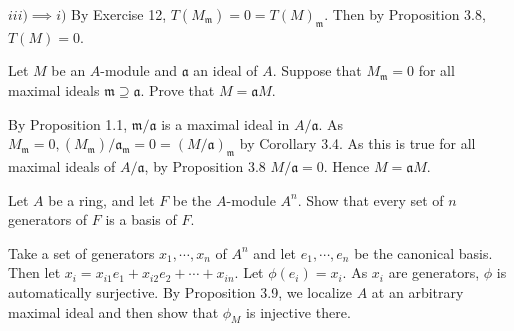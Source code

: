 \documentclass[a4paper]{exam}
\newif\ifhint
\begin{document}
\begin{questions}
\begin{solution}
	$iii) \implies i) $ By Exercise 12, $T(M_{\mathfrak{m}}) = 0 = T(M)_{\mathfrak{m}} $.
	Then by Proposition 3.8, $T(M) = 0 $.
\end{solution}

\question Let $M $ be an $A $-module and $\mathfrak{a} $ an ideal of $A $. Suppose that $M_{\mathfrak{m}} = 0 $ for all maximal ideals $\mathfrak{m} \supseteq \mathfrak{a} $. Prove that $M = \mathfrak{a}M $.
\ifhint
	Pass to the $A / \mathfrak{a} $-module $M / \mathfrak{a}M $ and use (3.8).
\fi
\begin{solution}
	By Proposition 1.1, $\mathfrak{m} / \mathfrak{a} $ is a maximal ideal in $A / \mathfrak{a} $.
	As $M_{\mathfrak{m}} = 0, (M_{\mathfrak{m}}) / \mathfrak{a}_{\mathfrak{m}} = 0 = (M / \mathfrak{a})_{\mathfrak{m}} $ by Corollary 3.4.
	As this is true for all maximal ideals of $A / \mathfrak{a} $, by Proposition 3.8 $M / \mathfrak{a} = 0 $.
	Hence $M = \mathfrak{a}M $.
\end{solution}

\question Let $A$ be a ring, and let $F$ be the $A$-module $A^n$. Show that every set of $n$ generators of $F$ is a basis of $F$.
\ifhint 
	Let $x_{1}, \cdots, x_n$ be a set of generators and $e_{1}, \cdots, e_n$ the canonical basis of $F$. Define $\phi: F \to F$ by $\phi(e_i) = x_i$. Then $\phi$ is surjective and we have to prove that it is an isomorphism. By (3.9) we may assume that $A$ is a local ring. Let $N$ be the kernel of $\phi$ and let $k = A /\mathfrak{m}$ be the residue field of $A$. Since $F$ is a flat $A$-module, the exact sequence $0 \to N \to F \to F \to 0 $ gives an exact sequence $0 \to k \otimes N \to k \otimes F \to k \otimes F \xrightarrow{1 \otimes \phi } 0$. Now $k \otimes F= k^n$ is an $n$-dimensional vector space over $k$; $1 \otimes \phi$ is surjective, hence bijective, hence $k \otimes N = 0$. \\
Also $N$ is finitely generated, by Chapter 2, Exercise 12, hence $N$ = 0 by Nakayama's lemma. Hence $\phi $ is an isomorphism.
\fi
\begin{solution}
	Take a set of generators $x_1,\cdots, x_n $ of $A^n $ and let $e_{1},\cdots, e_n $ be the canonical basis.
	Then let $x_{i} = x_{i1}e_{1} + x_{i2}e_{2} + \cdots + x_{in} $.
	Let $\phi(e_i) = x_i $.
	As $x_i $ are generators, $\phi  $ is automatically surjective.
	By Proposition 3.9, we localize $A $ at an arbitrary maximal ideal and then show that $\phi_M$ is injective there.


\end{solution}
\end{questions}
\end{document}
